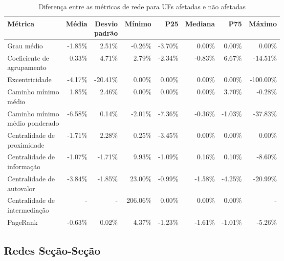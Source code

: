 \begin{table}[htb]
\centering
\caption{Diferença entre as métricas de rede para UFs afetadas e não afetadas}
\label{tab:metricas-redes-pandemia:diferenca-afetadas-por-uf}
\begin{tabular}{l|rrrrrrr}
\toprule
Métrica & Média & \shortstack{Desvio\\padrão} & Mínimo & P25 & Mediana & P75 & Máximo \\
\midrule
Grau médio                     & -1.85\% &   2.51\% &  -0.26\% & -3.70\% &  0.00\% &  0.00\% &    0.00\% \\ \hline
\shortstack[l]{Coeficiente de\\agrupamento}     &  0.33\% &   4.71\% &   2.79\% & -2.34\% & -0.83\% &  6.67\% &  -14.51\% \\ \hline
Excentricidade                 & -4.17\% & -20.41\% &   0.00\% &  0.00\% &  0.00\% &  0.00\% & -100.00\% \\ \hline
\shortstack[l]{Caminho mínimo\\médio}           &  1.85\% &   2.46\% &   0.00\% &  0.00\% &  0.00\% &  3.70\% &   -0.28\% \\ \hline
\shortstack[l]{Caminho mínimo\\médio ponderado} & -6.58\% &   0.14\% &  -2.01\% & -7.36\% & -0.36\% & -1.03\% &  -37.83\% \\ \hline
\shortstack[l]{Centralidade de\\proximidade}    & -1.71\% &   2.28\% &   0.25\% & -3.45\% &  0.00\% &  0.00\% &    0.00\% \\ \hline
\shortstack[l]{Centralidade de\\informação}     & -1.07\% &  -1.71\% &   9.93\% & -1.09\% &  0.16\% &  0.10\% &   -8.60\% \\ \hline
\shortstack[l]{Centralidade de\\autovalor}      & -3.84\% &  -1.85\% &  23.00\% & -0.99\% & -1.58\% & -4.25\% &  -20.99\% \\ \hline
\shortstack[l]{Centralidade de\\intermediação}  &  - &     - & 206.06\% &  0.00\% &  0.00\% &  0.00\% &    - \\ \hline
PageRank                       & -0.63\% &   0.02\% &   4.37\% & -1.23\% & -1.61\% & -1.01\% &   -5.26\% \\
\bottomrule
\end{tabular}
\fdadospesquisa
\end{table}

\subsection{Redes Seção-Seção}
\label{section:alteracoes-topologicas:secao}

